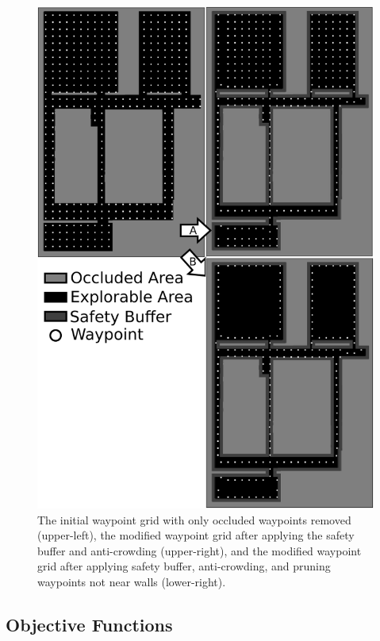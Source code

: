 \documentclass[letterpaper, 10 pt, conference]{ieeeconf}  %
\begin{document}
\begin{figure}
\centering
\includegraphics[width=1.0\linewidth]{waypoint3.png}
\caption[An example of the waypoint pruning process for the coverage planner.]{The initial waypoint grid with only occluded waypoints removed (upper-left), the modified waypoint grid after applying the safety buffer and anti-crowding (upper-right), and the modified waypoint grid after applying safety buffer, anti-crowding, and pruning waypoints not near walls (lower-right).}
\label{fig:waypoints}
\end{figure}

\subsection{Objective Functions}
\end{document}
